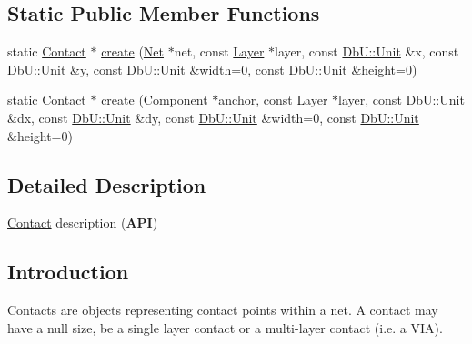 \subsection*{Static Public Member Functions}
\begin{DoxyCompactItemize}
\item 
static \mbox{\hyperlink{classHurricane_1_1Contact}{Contact}} $\ast$ \mbox{\hyperlink{classHurricane_1_1Contact_a5402fec0518c81d35fbec2c2b2ec0f8f}{create}} (\mbox{\hyperlink{classHurricane_1_1Net}{Net}} $\ast$net, const \mbox{\hyperlink{classHurricane_1_1Layer}{Layer}} $\ast$layer, const \mbox{\hyperlink{group__DbUGroup_ga4fbfa3e8c89347af76c9628ea06c4146}{Db\+U\+::\+Unit}} \&x, const \mbox{\hyperlink{group__DbUGroup_ga4fbfa3e8c89347af76c9628ea06c4146}{Db\+U\+::\+Unit}} \&y, const \mbox{\hyperlink{group__DbUGroup_ga4fbfa3e8c89347af76c9628ea06c4146}{Db\+U\+::\+Unit}} \&width=0, const \mbox{\hyperlink{group__DbUGroup_ga4fbfa3e8c89347af76c9628ea06c4146}{Db\+U\+::\+Unit}} \&height=0)
\item 
static \mbox{\hyperlink{classHurricane_1_1Contact}{Contact}} $\ast$ \mbox{\hyperlink{classHurricane_1_1Contact_a6645345f819cb4769fac075a0b1ea028}{create}} (\mbox{\hyperlink{classHurricane_1_1Component}{Component}} $\ast$anchor, const \mbox{\hyperlink{classHurricane_1_1Layer}{Layer}} $\ast$layer, const \mbox{\hyperlink{group__DbUGroup_ga4fbfa3e8c89347af76c9628ea06c4146}{Db\+U\+::\+Unit}} \&dx, const \mbox{\hyperlink{group__DbUGroup_ga4fbfa3e8c89347af76c9628ea06c4146}{Db\+U\+::\+Unit}} \&dy, const \mbox{\hyperlink{group__DbUGroup_ga4fbfa3e8c89347af76c9628ea06c4146}{Db\+U\+::\+Unit}} \&width=0, const \mbox{\hyperlink{group__DbUGroup_ga4fbfa3e8c89347af76c9628ea06c4146}{Db\+U\+::\+Unit}} \&height=0)
\end{DoxyCompactItemize}


\subsection{Detailed Description}
\mbox{\hyperlink{classHurricane_1_1Contact}{Contact}} description ({\bfseries A\+PI}) 

\hypertarget{classHurricane_1_1Contact_secContactIntro}{}\subsection{Introduction}\label{classHurricane_1_1Contact_secContactIntro}
Contacts are objects representing contact points within a net. A contact may have a null size, be a single layer contact or a multi-\/layer contact (i.\+e. a V\+IA). 


